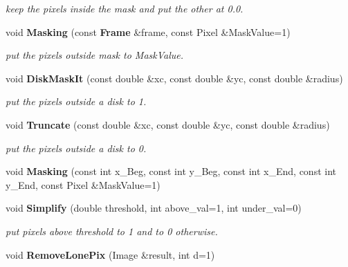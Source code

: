 \begin{CompactItemize}
\begin{CompactList}\small\item\em keep the pixels inside the mask and put the other at 0.0.\item\end{CompactList}\item 
{}
void {\bf Masking} (const {\bf Frame} \&frame, const Pixel \&Mask\-Value=1)\label{class_image_a52}

\begin{CompactList}\small\item\em put the pixels outside mask to Mask\-Value.\item\end{CompactList}\item 
{}
void {\bf Disk\-Mask\-It} (const double \&xc, const double \&yc, const double \&radius)\label{class_image_a53}

\begin{CompactList}\small\item\em put the pixels outside a disk to 1.\item\end{CompactList}\item 
{}
void {\bf Truncate} (const double \&xc, const double \&yc, const double \&radius)\label{class_image_a54}

\begin{CompactList}\small\item\em put the pixels outside a disk to 0.\item\end{CompactList}\item 
{}
void {\bf Masking} (const int x\_\-Beg, const int y\_\-Beg, const int x\_\-End, const int y\_\-End, const Pixel \&Mask\-Value=1)\label{class_image_a55}

\item 
{}
void {\bf Simplify} (double threshold, int above\_\-val=1, int under\_\-val=0)\label{class_image_a56}

\begin{CompactList}\small\item\em put pixels above threshold to 1 and to 0 otherwise.\item\end{CompactList}\item 
{}
void {\bf Remove\-Lone\-Pix} (Image \&result, int d=1)\label{class_image_a57}


\end{CompactItemize}
